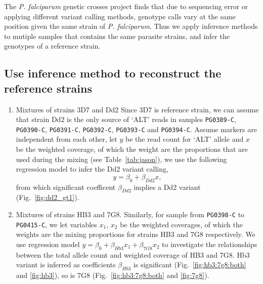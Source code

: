 The {\em P. falciparum} genetic crosses project \citep{Miles2015:sup} finds that due to sequencing error or applying different variant calling methods, genotype calls vary at the same position given the same strain of {\em P. falciparum}. Thus we apply inference methods to mutiple samples that contains the same parasite strains, and infer the genotypes of a reference strain.


\subsection{Use inference method to reconstruct the reference strains}
\begin{enumerate}
\item Mixtures of strains 3D7 and Dd2
Since 3D7 is reference strain, we can assume that strain Dd2 is the only source of `ALT' reads in samples {\tt PG0389-C}, {\tt PG0390-C}, {\tt PG0391-C}, {\tt PG0392-C}, {\tt PG0393-C} and {\tt PG0394-C}. Assume markers are independent from each other, let $y$ be the read count for `ALT' allele and $x$ be the weighted coverage, of which the weight are the proportions that are used during the mixing (see Table~\ref{tab:jason}), we use the following regression model to infer the Dd2 variant calling, $$y = \beta_0 + \beta_{Dd2} x,$$
from which significant coefficent $\beta_{Dd2}$ implies a Dd2 variant (Fig.~\ref{fig:dd2_gt1}).

\item Mixtures of strains HB3 and 7G8.
Similarly, for sample from {\tt PG0398-C} to {\tt PG0415-C},  we let variables $x_1$, $x_2$ be the weighted coverages, of which the weights are the mixing proportions for strains HB3 and 7G8 respectively. We use regression model $y = \beta_0 + \beta_{Hb3} x_1 + \beta_{7G8} x_2$ to investigate the relationships between the total allele count and weighted coverage of HB3 and 7G8. Hb3 variant is inferred as coefficients $\beta_{Hb3}$ is significant (Fig.~\ref{fig:hb3:7g8:both} and \ref{fig:hb3}), so is 7G8 (Fig.~\ref{fig:hb3:7g8:both} and \ref{fig:7g8}).
\end{enumerate}



